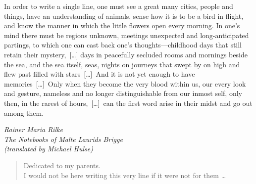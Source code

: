 
\begin{dedication} 
\setlength{\epigraphwidth}{0.63\textwidth}

\vspace*{-.25\paperheight}  
\epigraph{%
	In order to write a single line, one must see a great many cities, people and things, have an understanding of animals, sense how it is to be a bird in flight, and know the manner in which the little flowers open every morning. In one's mind there must be regions unknown, meetings unexpected and long-anticipated partings, to which one can cast back one's thoughts---childhood days that still retain their mystery,~[\dots] days in peacefully secluded rooms and mornings beside the sea, and the sea itself, seas, nights on journeys that swept by on high and flew past filled with stars~[\dots]~And it is not yet enough to have memories~[\dots]~Only when they become the very blood within us, our every look and gesture, nameless and no longer distinguishable from our inmost self, only then, in the rarest of hours,~[\dots]~can the first word arise in their midst and go out among them.}{\textit{Rainer Maria Rilke\\ The Notebooks of Malte Laurids Brigge~\\(translated by Michael Hulse)}}


\begin{quote} 
	\centering \vspace{2cm}
	\LARGE{Dedicated to my parents.}\\
	I would not be here writing this very line if it were not for them \ldots 
\end{quote}



\end{dedication}

